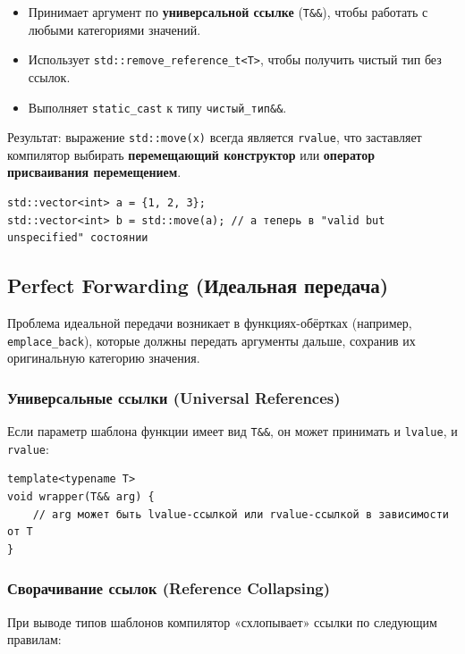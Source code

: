 \documentclass[a4paper,12pt]{article}
\begin{document}
\begin{itemize}
  \item Принимает аргумент по \textbf{универсальной ссылке} (\texttt{T\&\&}), чтобы
        работать с любыми категориями значений.
  \item Использует \texttt{std::remove\_reference\_t<T>}, чтобы получить чистый тип
        без ссылок.
  \item Выполняет \texttt{static\_cast} к типу \texttt{чистый\_тип\&\&}.
\end{itemize}

Результат: выражение \texttt{std::move(x)} всегда является \texttt{rvalue}, что
заставляет компилятор выбирать \textbf{перемещающий конструктор} или
\textbf{оператор присваивания перемещением}.

\begin{lstlisting}
std::vector<int> a = {1, 2, 3};
std::vector<int> b = std::move(a); // a теперь в "valid but unspecified" состоянии
\end{lstlisting}

\subsection{Perfect Forwarding (Идеальная передача)}

Проблема идеальной передачи возникает в функциях-обёртках (например,
\texttt{emplace\_back}), которые должны передать аргументы дальше, сохранив их
оригинальную категорию значения.

\subsubsection{Универсальные ссылки (Universal References)}

Если параметр шаблона функции имеет вид \texttt{T\&\&}, он может принимать и
\texttt{lvalue}, и \texttt{rvalue}:

\begin{lstlisting}
template<typename T>
void wrapper(T&& arg) {
    // arg может быть lvalue-ссылкой или rvalue-ссылкой в зависимости от T
}
\end{lstlisting}

\subsubsection{Сворачивание ссылок (Reference Collapsing)}

При выводе типов шаблонов компилятор «схлопывает» ссылки по следующим правилам:
\end{document}
